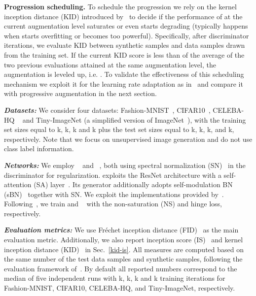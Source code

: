\documentclass{article}
\begin{document}
\textbf{Progression scheduling.} \label{subsec:PA-schedule}
To schedule the progression we rely on the kernel inception distance (KID) introduced by~\cite{Binkowski2016MMDGAN} to decide if the performance of  at the current augmentation level saturates or even starts degrading (typically happens when  starts overfitting or becomes too powerful). Specifically, after  discriminator iterations, we evaluate KID between synthetic samples and data samples drawn from the training set. If the current KID score is less than  of the average of the two previous evaluations attained at the same augmentation level, the augmentation is leveled up, i.e. . To validate the effectiveness of this scheduling mechanism we exploit it for the learning rate adaptation as in~\cite{Binkowski2016MMDGAN} and compare it with progressive augmentation in the next section. %



\emph{\textbf{Datasets:}}  We consider four datasets: Fashion-MNIST~\cite{xiao2017}, CIFAR10~\cite{Cifar10_Krizhevsky09learningmultiple}, CELEBA-HQ ~\cite{karras2018progressive} and Tiny-ImageNet (a simplified version of ImageNet~\cite{imagenet_cvpr09}), with the training set sizes equal to \unit{k}, \unit{k}, \unit{k} and \unit{k} plus the test set sizes equal to \unit{k}, \unit{k}, \unit{k}, and \unit{k}, respectively. Note that we focus on unsupervised image generation and do not use class label information.

\emph{\textbf{Networks:}} 
We employ ~\cite{miyato2018spectral} and ~\cite{Zhang_SAGAN18}, both using spectral normalization (SN)~\cite{miyato2018spectral} in the discriminator for regularization.  exploits the ResNet architecture with a self-attention (SA) layer~\cite{Zhang_SAGAN18}. Its generator additionally adopts self-modulation BN (sBN)~\cite{chen2018on} together with SN. We exploit the implementations provided by~\cite{Kurach2018GANlandscape,Zhang_SAGAN18}. Following~\cite{miyato2018spectral,Zhang_SAGAN18}, we train  and ~\cite{Zhang_SAGAN18} with the non-saturation (NS) and hinge loss, respectively. 


\emph{\textbf{Evaluation metrics:}} 
We use Fr{\'e}chet inception distance (FID)~\cite{FID} as the main evaluation metric. Additionally, we also report inception score (IS)~\cite{Theis2016a} and kernel inception distance (KID)~\cite{Binkowski2016MMDGAN} in Sec.~\ref{kid-is}. All measures are computed based on the same number of the test data samples and synthetic samples, following the evaluation framework of~\cite{LucicEqualGANs,Kurach2018GANlandscape}. By default all reported numbers correspond to the median of five independent runs with \unit{k}, \unit{k}, \unit{k} and \unit{k} training iterations for Fashion-MNIST, CIFAR10, CELEBA-HQ, and Tiny-ImageNet, respectively. 
\end{document}
